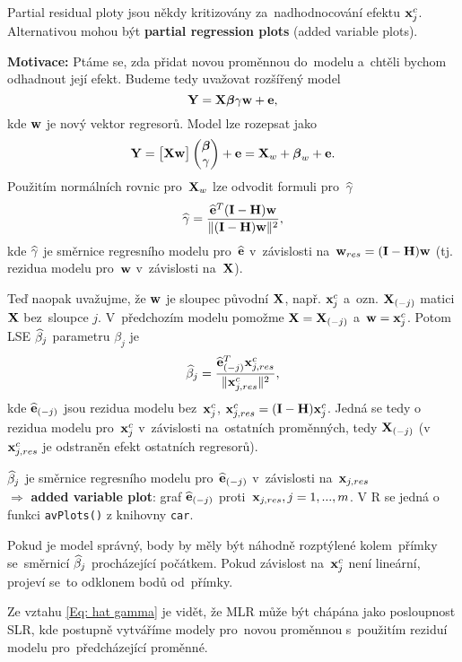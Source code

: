 \begin{remark}
	Partial residual ploty jsou někdy kritizovány za~nadhodnocování efektu $\mathbf{x}_j^c$. Alternativou mohou být \textbf{partial regression plots} (added variable plots).
\end{remark}
	\textbf{Motivace:} Ptáme se, zda přidat novou proměnnou do~modelu a~chtěli bychom odhadnout její efekt. Budeme tedy uvažovat rozšířený model
	 $$
	\mathbf{Y} = \mathbf{X} \boldsymbol{\beta}\gamma \mathbf{w} + \mathbf{e},
	 $$
	kde $\mathbf{w}$ je nový vektor regresorů. Model lze rozepsat jako
	 $$
	\mathbf{Y} = \begin{bmatrix}
	\mathbf{X} \mathbf{w}
	\end{bmatrix} \begin{pmatrix}
	\boldsymbol{\beta} \\ \gamma
	\end{pmatrix} + \mathbf{e} = \mathbf{X}_w + \boldsymbol{\beta}_w + \mathbf{e}.
	 $$
	Použitím normálních rovnic pro~$\mathbf{X}_w$ lze odvodit formuli pro~$\widehat{\gamma}$
	\begin{equation}
		\widehat{\gamma} = \frac{\widehat{\mathbf{e}}^T (\textbf{I} - \textbf{H}) \mathbf{w}}{\| (\textbf{I} - \textbf{H})\mathbf{w} \|^2},
		\label{Eq: hat gamma}
	\end{equation}
	kde $\widehat{\gamma}$ je směrnice regresního modelu pro~$\widehat{\mathbf{e}}$ v~závislosti na~$\mathbf{w}_{res} = (\textbf{I} - \textbf{H})\mathbf{w}$ (tj. rezidua modelu pro~$\mathbf{w}$ v~závislosti na~$\mathbf{X}$).
	
	Teď naopak uvažujme, že $\mathbf{w}$ je sloupec původní $\mathbf{X}$, např. $\mathbf{x}_j^c$ a~ozn. $\mathbf{X}_{(-j)}$ matici $\mathbf{X}$ bez~sloupce $j$. V~předchozím modelu pomožme $\mathbf{X} = \mathbf{X}_{(-j)}$ a~$\mathbf{w} = \mathbf{x}_j^c$. Potom  LSE $\widehat{\beta}_j$ parametru $\beta_j$ je
	 $$
	\widehat{\beta}_j = \frac{\widehat{\mathbf{e}}_{(-j)}^T \mathbf{x}_{j, res}^c}{\| \mathbf{x}_{j,res}^c \|^2},
	 $$
	kde $\widehat{\mathbf{e}}_{(-j)}$ jsou rezidua modelu bez~$\mathbf{x}_j^c$, $\mathbf{x}_{j,res}^c = (\textbf{I} - \textbf{H}) \mathbf{x}_j^c$. Jedná se tedy o rezidua modelu pro~$\mathbf{x}_j^c$ v~závislosti na~ostatních proměnných, tedy $\mathbf{X}_{(-j)}$ (v $\mathbf{x}_{j,res}^c$ je odstraněn efekt ostatních regresorů).
	
	 $\widehat{\beta}_j$ je směrnice regresního modelu pro~$\widehat{\mathbf{e}}_{(-j)}$ v~závislosti na~$\mathbf{x}_{j, res}$ \\ $\Rightarrow$ \textbf{added variable plot}: graf $\widehat{\mathbf{e}}_{(-j)}$ proti~$\mathbf{x}_{j, res}, j = 1,..., m$. V R se jedná o funkci \verb|avPlots()| z knihovny \verb|car|.
	
	Pokud je model správný, body by měly být náhodně rozptýlené kolem~přímky se~směrnicí $\widehat{\beta}_j$ procházející počátkem. Pokud závislost na~$\mathbf{x}_j^c$ není lineární, projeví se~to odklonem bodů od~přímky.


\begin{remark}
Ze vztahu \eqref{Eq: hat gamma} je vidět, že MLR může být chápána jako posloupnost SLR, kde postupně vytváříme modely pro~novou proměnnou s~použitím reziduí modelu pro~předcházející proměnné.
\end{remark}

